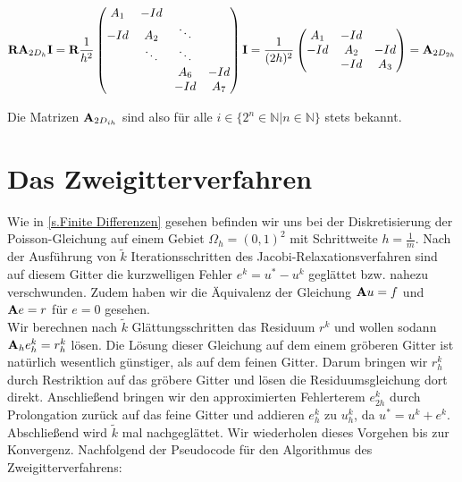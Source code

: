 \begin{equation}
{\textbf{R}}{\textbf{A}}_{2D_{h}}{\textbf{I}} = {\textbf{R}} \frac{1}{h^{2}}
\begin{pmatrix}
A_{1} & -Id \\
-Id & A_{2} & \ddots \\
 & \ddots & \ddots \\
 & & A_{6} & -Id\\
 & & -Id & A_{7}
\end{pmatrix}
{\textbf{I}} = \frac{1}{(2h)^{2}}
\begin{pmatrix}
A_{1} & -Id \\
-Id & A_{2} & -Id \\
 & -Id & A_{3}
\end{pmatrix}
= {\textbf{A}}_{2D_{2h}}
\end{equation}

Die Matrizen ${\textbf{A}}_{2D_{ih}}$ sind also für alle $i \in \{2^{n} \in \mathbb{N} | n \in \mathbb{N} \}$ stets bekannt.

\section{Das Zweigitterverfahren}\label{s.Der Zweigitter-Algorithmus}

Wie in \autoref{s.Finite Differenzen} gesehen befinden wir uns bei der Diskretisierung der Poisson-Gleichung auf einem Gebiet $\Omega_{h} = (0,1)^{2}$ mit Schrittweite $h = \frac {1} {m}$. Nach der Ausführung von $\tilde k$ Iterationsschritten des Jacobi-Relaxationsverfahren sind auf diesem Gitter die kurzwelligen Fehler $e^{k} = u^{*} - u^{k}$ geglättet bzw. nahezu verschwunden. Zudem haben wir die Äquivalenz der Gleichung ${\textbf{A}} u = f$ und ${\textbf{A}} e = r$ für $e = 0$ gesehen.\\
Wir berechnen nach $\tilde k$ Glättungsschritten das Residuum $r^{k}$ und wollen sodann ${\textbf{A}}_{h} e^{k}_{h} = r^{k}_{h}$ lösen. Die Lösung dieser Gleichung auf dem einem gröberen Gitter ist natürlich wesentlich günstiger, als auf dem feinen Gitter. Darum bringen wir $r^{k}_{h}$ durch Restriktion auf das gröbere Gitter und lösen die Residuumsgleichung dort direkt. Anschließend bringen wir den approximierten Fehlerterem $e_{2h}^{k}$ durch Prolongation zurück auf das feine Gitter und addieren $e_{h}^{k}$ zu $u_{h}^{k}$, da $u^{*} = u^{k} + e^{k}$. Abschließend wird $\tilde k$ mal nachgeglättet. Wir wiederholen dieses Vorgehen bis zur Konvergenz. Nachfolgend der Pseudocode für den Algorithmus des Zweigitterverfahrens:

